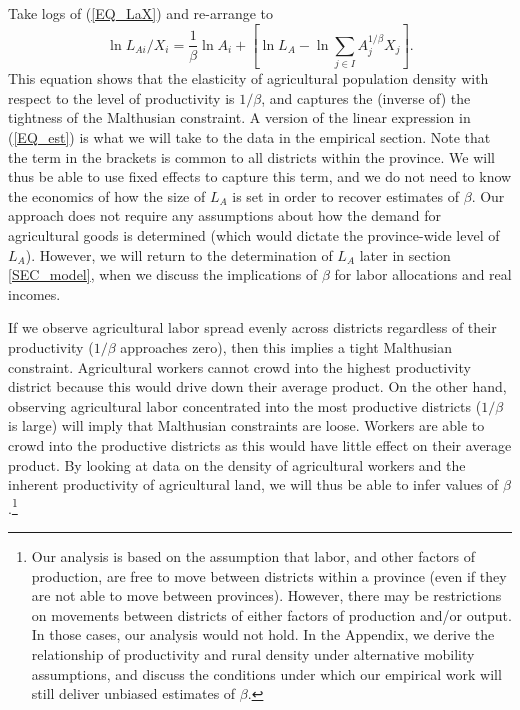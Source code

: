 \documentclass[11pt]{article}
\begin{document}
Take logs of (\ref{EQ_LaX}) and re-arrange to
\begin{equation}
\ln L_{Ai}/X_i = \frac{1}{\beta} \ln A_{i} + \left[\ln L_A - \ln \sum_{j\in I} A_{j}^{1/\beta}X_{j} \right]. \label{EQ_est}
\end{equation}
This equation shows that the elasticity of agricultural population density with respect to the level of productivity is $1/\beta$, and captures the (inverse of) the tightness of the Malthusian constraint. A version of the linear expression in (\ref{EQ_est}) is what we will take to the data in the empirical section. Note that the term in the brackets is common to all districts within the province. We will thus be able to use fixed effects to capture this term, and we do not need to know the economics of how the size of $L_A$ is set in order to recover estimates of $\beta$. Our approach does not require any assumptions about how the demand for agricultural goods is determined (which would dictate the province-wide level of $L_A$). However, we will return to the determination of $L_A$ later in section \ref{SEC_model}, when we discuss the implications of $\beta$ for labor allocations and real incomes.

If we observe agricultural labor spread evenly across districts regardless of their productivity ($1/\beta$ approaches zero), then this implies a tight Malthusian constraint. Agricultural workers cannot crowd into the highest productivity district because this would drive down their average product. On the other hand, observing agricultural labor concentrated into the most productive districts ($1/\beta$ is large) will imply that Malthusian constraints are loose. Workers are able to crowd into the productive districts as this would have little effect on their average product. By looking at data on the density of agricultural workers and the inherent productivity of agricultural land, we will thus be able to infer values of $\beta$.\footnote{Our analysis is based on the assumption that labor, and other factors of production, are free to move between districts within a province (even if they are not able to move between provinces). However, there may be restrictions on movements between districts of either factors of production and/or output. In those cases, our analysis would not hold. In the Appendix, we derive the relationship of productivity and rural density under alternative mobility assumptions, and discuss the conditions under which our empirical work will still deliver unbiased estimates of $\beta$.}
\end{document}
